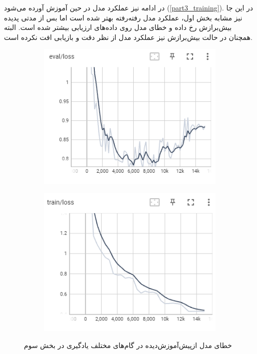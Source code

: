 \documentclass[12pt, a4paper]{book}
\begin{document}
در ادامه نیز عملکرد مدل  در حین آموزش آورده می‌شود (\autoref{part3_training}).
در این جا نیز مشابه بخش اول، عملکرد مدل رفته‌رفته بهتر شده است اما بس از مدتی پدیده بیش‌برازش رخ داده و
خطای مدل روی داده‌های ارزیابی بیشتر شده است. البته همچنان در حالت بیش‌برازش نیز عملکرد مدل از نظر دقت و
بازیابی افت نکرده است.

\begin{figure}[h]
    \centering
    \begin{subfigure}{0.45\linewidth}
        \centering
        \includegraphics[width=\linewidth]{image/part3/tb/3.png}
    \end{subfigure}
    \hfil
    \begin{subfigure}{0.45\linewidth}
        \centering
        \includegraphics[width=\linewidth]{image/part3/tb/6.png}
    \end{subfigure}
    \caption{خطای مدل ازپیش‌آموزش‌دیده  در گام‌های مختلف یادگیری در بخش سوم}
    \label{part3_training}
\end{figure}
\end{document}
